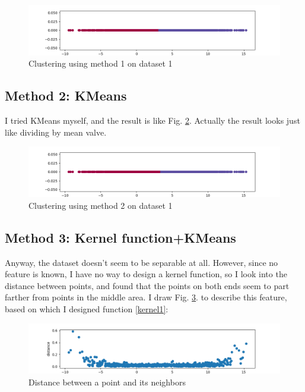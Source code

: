 \documentclass[conference]{IEEEtran}
\begin{document}
\begin{figure}[htbp]
	\centerline{\includegraphics[scale=0.375]{m1p1.png}}
	\caption{Clustering using method 1 on dataset 1}
	\label{m1p1}
\end{figure}

\subsection{Method 2: KMeans}
I tried KMeans myself, and the result is like Fig. \ref{m2p1}. Actually the result looks just like dividing by mean valve.

\begin{figure}[htbp]
	\centerline{\includegraphics[scale=0.375]{m2p1.png}}
	\caption{Clustering using method 2 on dataset 1}
	\label{m2p1}
\end{figure}

\subsection{Method 3: Kernel function+KMeans}
Anyway, the dataset doesn't seem to be separable at all. However, since no feature is known, I have no way to design a kernel function, so
I look into the distance between points, and found that the points on both ends seem to part farther from points in the middle area. I draw Fig. \ref{distance1}. to describe this feature, based on which I designed function \ref{kernel1}:

\begin{figure}[htbp]
	\centerline{\includegraphics[scale=0.375]{distance1.png}}
	\caption{Distance between a point and its neighbors}
	\label{distance1}
\end{figure}
\end{document}

